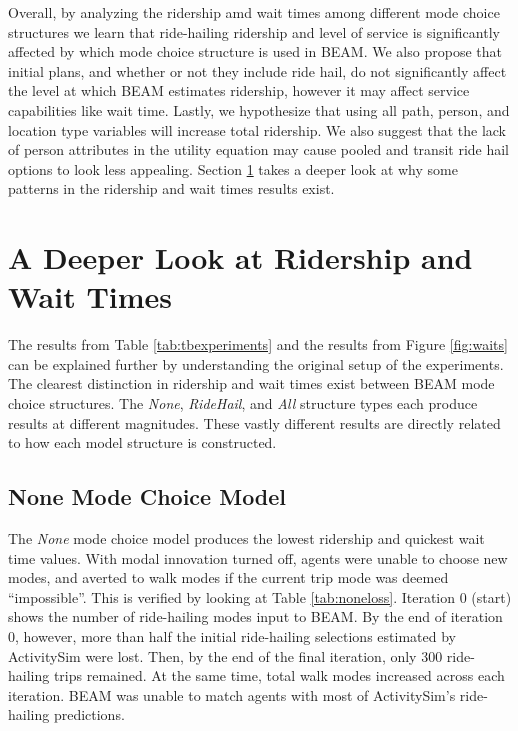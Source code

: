 \documentclass[fancy, masters]{byuthesis}
\begin{document}
Overall, by analyzing the ridership amd wait times among different mode choice structures we learn that ride-hailing ridership and level of service is significantly affected by which mode choice structure is used in BEAM. We also propose that initial plans, and whether or not they include ride hail, do not significantly affect the level at which BEAM estimates ridership, however it may affect service capabilities like wait time. Lastly, we hypothesize that using all path, person, and location type variables will increase total ridership. We also suggest that the lack of person attributes in the utility equation may cause pooled and transit ride hail options to look less appealing. Section \ref{deep-look} takes a deeper look at why some patterns in the ridership and wait times results exist.

\hypertarget{deep-look}{%
\section{A Deeper Look at Ridership and Wait Times}\label{deep-look}}

The results from Table \ref{tab:tbexperiments} and the results from Figure \ref{fig:waits} can be explained further by understanding the original setup of the experiments. The clearest distinction in ridership and wait times exist between BEAM mode choice structures. The \emph{None}, \emph{RideHail}, and \emph{All} structure types each produce results at different magnitudes. These vastly different results are directly related to how each model structure is constructed.

\hypertarget{type1}{%
\subsection{None Mode Choice Model}\label{type1}}

The \emph{None} mode choice model produces the lowest ridership and quickest wait time values. With modal innovation turned off, agents were unable to choose new modes, and averted to walk modes if the current trip mode was deemed ``impossible''. This is verified by looking at Table \ref{tab:noneloss}. Iteration 0 (start) shows the number of ride-hailing modes input to BEAM. By the end of iteration 0, however, more than half the initial ride-hailing selections estimated by ActivitySim were lost. Then, by the end of the final iteration, only 300 ride-hailing trips remained. At the same time, total walk modes increased across each iteration. BEAM was unable to match agents with most of ActivitySim's ride-hailing predictions.
\end{document}
